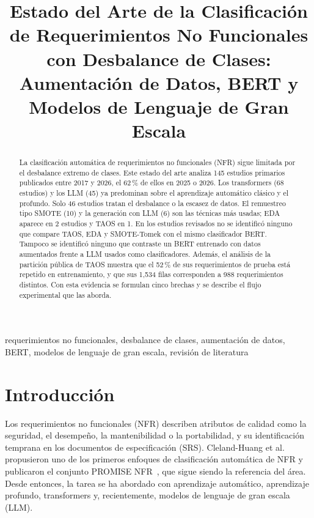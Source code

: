\documentclass[conference]{IEEEtran}
\begin{document}
\title{Estado del Arte de la Clasificación de Requerimientos No Funcionales con Desbalance de Clases: Aumentación de Datos, BERT y Modelos de Lenguaje de Gran Escala}

\author{%
}   

\maketitle

\begin{abstract}
La clasificación automática de requerimientos no funcionales (NFR) sigue limitada por el desbalance extremo de clases. Este estado del arte analiza 145 estudios primarios publicados entre 2017 y 2026, el 62\,\% de ellos en 2025 o 2026. Los transformers (68 estudios) y los LLM (45) ya predominan sobre el aprendizaje automático clásico y el profundo. Solo 46 estudios tratan el desbalance o la escasez de datos. El remuestreo tipo SMOTE (10) y la generación con LLM (6) son las técnicas más usadas; EDA aparece en 2 estudios y TAOS en 1. En los estudios revisados no se identificó ninguno que compare TAOS, EDA y SMOTE-Tomek con el mismo clasificador BERT. Tampoco se identificó ninguno que contraste un BERT entrenado con datos aumentados frente a LLM usados como clasificadores. Además, el análisis de la partición pública de TAOS muestra que el 52\,\% de sus requerimientos de prueba está repetido en entrenamiento, y que sus 1,534 filas corresponden a 988 requerimientos distintos. Con esta evidencia se formulan cinco brechas y se describe el flujo experimental que las aborda.
\end{abstract}

\begin{IEEEkeywords}
requerimientos no funcionales, desbalance de clases, aumentación de datos, BERT, modelos de lenguaje de gran escala, revisión de literatura
\end{IEEEkeywords}

\section{Introducción}
Los requerimientos no funcionales (NFR) describen atributos de calidad como la seguridad, el desempeño, la mantenibilidad o la portabilidad, y su identificación temprana en los documentos de especificación (SRS). Cleland-Huang et al.~\cite{ClelandHuang2007-NFR} propusieron uno de los primeros enfoques de clasificación automática de NFR y publicaron el conjunto PROMISE NFR~\cite{ClelandHuang2007-NFRdata}, que sigue siendo la referencia del área. Desde entonces, la tarea se ha abordado con aprendizaje automático, aprendizaje profundo, transformers y, recientemente, modelos de lenguaje de gran escala (LLM).
\end{document}
